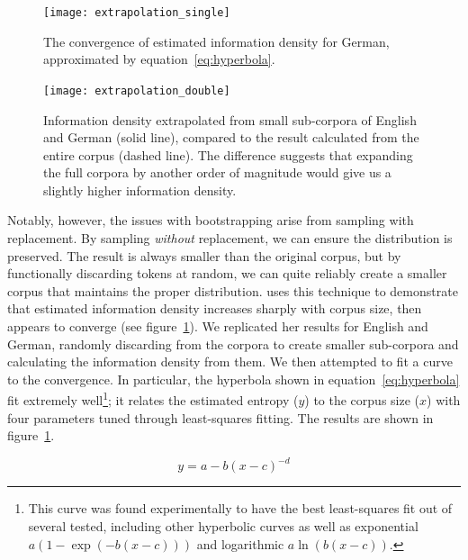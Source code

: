 \documentclass[12pt,twoside]{article}
\begin{document}
\begin{figure}[p]
\centering
\caption{The convergence of estimated information density for German, approximated by equation~\ref{eq:hyperbola}.}
\label{fig:exsingle}
\noindent\texttt{[image: extrapolation\_single]}
\end{figure}

\begin{figure}[p]
\centering
\caption{Information density extrapolated from small sub-corpora of English and German (solid line), compared to the result calculated from the entire corpus (dashed line). The difference suggests that expanding the full corpora by another order of magnitude would give us a slightly higher information density.}
\label{fig:exdouble}
\noindent\texttt{[image: extrapolation\_double]}
\end{figure}

Notably, however, the issues with bootstrapping arise from sampling with replacement. By sampling \emph{without} replacement, we can ensure the distribution is preserved. The result is always smaller than the original corpus, but by functionally discarding tokens at random, we can quite reliably create a smaller corpus that maintains the proper distribution. \citet[57]{oh} uses this technique to demonstrate that estimated information density increases sharply with corpus size, then appears to converge (see figure~\ref{fig:exsingle}). We replicated her results for English and German, randomly discarding from the corpora to create smaller sub-corpora and calculating the information density from them. We then attempted to fit a curve to the convergence. In particular, the hyperbola shown in equation~\ref{eq:hyperbola} fit extremely well\footnote{This curve was found experimentally to have the best least-squares fit out of several tested, including other hyperbolic curves as well as exponential \(a(1-\exp(-b(x-c)))\) and logarithmic \(a\ln(b(x-c))\).}; it relates the estimated entropy (\(y\)) to the corpus size (\(x\)) with four parameters tuned through least-squares fitting. The results are shown in figure~\ref{fig:exsingle}.

\begin{equation}
\label{eq:hyperbola}
y = a-b(x-c)^{-d}
\end{equation}
\end{document}
